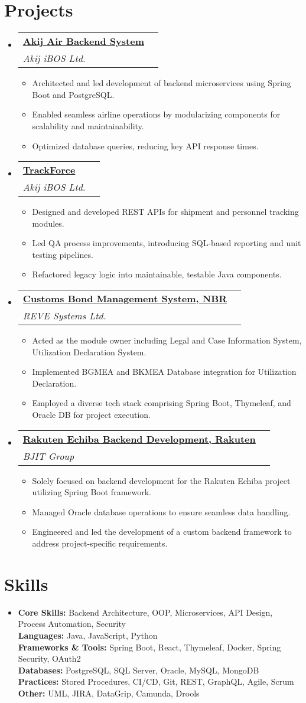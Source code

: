 \documentclass[a4paper,11pt]{article}
\makeatletter
\newcommand{\resumeItem}[1]{\item[$\bullet$] \small{#1 \vspace{-2pt}}}
\newcommand{\resumeSubHeadingListStart}{\begin{itemize}[leftmargin=0pt, label={}]}
\newcommand{\resumeSubHeadingListEnd}{\end{itemize}}
\newcommand{\resumeItemListStart}{\begin{itemize}}
\newcommand{\resumeItemListEnd}{\end{itemize}\vspace{-5pt}}
\newcommand{\resumeSubheading}[5]{
    \vspace{-1pt}\item
    \begin{tabular*}{1\textwidth}{l@{\extracolsep{\fill}}r}
    \textbf{\href{#4}{#1}} & #2 \\
    \textit{\small#3} & \textit{\small #5} \\
    \end{tabular*}\vspace{-5pt}
}
\makeatother
\begin{document}
\section{Projects}
\resumeSubHeadingListStart
\resumeSubheading
{Akij Air Backend System}{}
{Akij iBOS Ltd.}{https://ibos.io/}{}
\resumeItemListStart
\resumeItem{Architected and led development of backend microservices using Spring Boot and PostgreSQL.}
\resumeItem{Enabled seamless airline operations by modularizing components for scalability and maintainability.}
\resumeItem{Optimized database queries, reducing key API response times.}
\resumeItemListEnd
\resumeSubheading
{TrackForce}{}
{Akij iBOS Ltd.}{https://app.trackforce.io/}{}
\resumeItemListStart
\resumeItem{Designed and developed REST APIs for shipment and personnel tracking modules.}
\resumeItem{Led QA process improvements, introducing SQL-based reporting and unit testing pipelines.}
\resumeItem{Refactored legacy logic into maintainable, testable Java components.}
\resumeItemListEnd
\resumeSubheading
{Customs Bond Management System, NBR}{}
{REVE Systems Ltd.}{https://cusbond.gov.bd/}{}
\resumeItemListStart
\resumeItem{Acted as the module owner including Legal and Case Information System, Utilization Declaration System.}
\resumeItem{Implemented BGMEA and BKMEA Database integration for Utilization Declaration.}
\resumeItem{Employed a diverse tech stack comprising Spring Boot, Thymeleaf, and Oracle DB for project execution.}
\resumeItemListEnd
\resumeSubheading
{Rakuten Echiba Backend Development, Rakuten}{}
{BJIT Group}{https://www.rakuten.co.jp/}{}
\resumeItemListStart
\resumeItem{Solely focused on backend development for the Rakuten Echiba project utilizing Spring Boot framework.}
\resumeItem{Managed Oracle database operations to ensure seamless data handling.}
\resumeItem{Engineered and led the development of a custom backend framework to address project-specific requirements.}
\resumeItemListEnd
\resumeSubHeadingListEnd

\section{Skills}
\resumeSubHeadingListStart
\item{
      \textbf{Core Skills:} Backend Architecture, OOP, Microservices, API Design, Process Automation, Security \\
      \textbf{Languages:} Java, JavaScript, Python \\
      \textbf{Frameworks \& Tools:} Spring Boot, React, Thymeleaf, Docker, Spring Security, OAuth2 \\
      \textbf{Databases:} PostgreSQL, SQL Server, Oracle, MySQL, MongoDB \\
      \textbf{Practices:} Stored Procedures, CI/CD, Git, REST, GraphQL, Agile, Scrum \\
      \textbf{Other:} UML, JIRA, DataGrip, Camunda, Drools
}
\resumeSubHeadingListEnd
\end{document}
